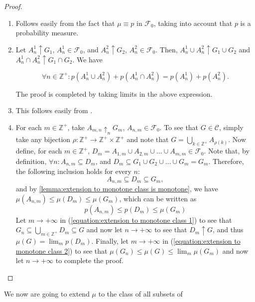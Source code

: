 \begin{proof}
	\begin{enumerate}
		\item Follows easily from the fact that \(\mu\equiv p\) in \(\mathcal{F}_0\),
taking into account that \(p\) is a probability measure.
		\item Let \(A_n^1\uparrow G_1\), \(A_n^1\in\mathcal{F}_0\), and
\(A_n^2\uparrow G_2\), \(A_n^2\in\mathcal{F}_0\). Then,
\(A_n^1\cup A_n^2\uparrow G_1\cup G_2\) and
\(A_n^1\cap A_n^2\uparrow G_1\cap G_2\). We have
		
		\[\forall n\in\mathbb{Z}^+:p(A_n^1\cup A_n^2)+p(A_n^1\cap A_n^2)=p(A_n^1)+p(A_n^2).\]
		
		The proof is completed by taking limits in the above expression.
		\item This follows easily from .
		\item For each \(m\in\mathbb{Z}^+\), take \(A_{m,n}\uparrow_{n} G_m\),
\(A_{n,m}\in\mathcal{F}_0\). To see that \(G\in\mathcal{C}\), simply take any bijection
\(\rho\colon\mathbb{Z}^+\to\mathbb{Z}^+\times\mathbb{Z}^+\) and note that
\(G=\bigcup_{k\in\mathbb{Z}^+}A_{\rho(k)}\). Now define, for each \(m\in\mathbb{Z}^+\),
\(D_m=A_{1,m}\cup A_{2,m}\cup\dots\cup A_{m,m}\in\mathcal{F}_0\). Note that, by
definition, \(\forall n:A_{n,m}\subseteq D_m\), and
\(D_m\subseteq G_1\cup G_2\cup\dots\cup G_m=G_m\). Therefore, the following
inclusion holds for every \(n\):
		\begin{equation}\label{equation:extension to monotone class
1} A_{n,m}\subseteq D_m\subseteq G_m,
		\end{equation} and by \ref{lemma:extension to monotone class is
monotone}, we have \(\mu(A_{n,m})\leq \mu(D_m)\leq\mu(G_m)\), which can be
written as
		\begin{equation}\label{equation:extension to monotone class
2} p(A_{n,m})\leq p(D_m)\leq\mu(G_m)
		\end{equation} Let \(m\to+\infty\) in (\ref{equation:extension to monotone class 1}) to see that \(G_n\subseteq \bigcup_{m\in\mathbb{Z}^+}D_m\subseteq G\) and now
let \(n\to+\infty\) to see that \(D_m\uparrow G\), and thus
\(\mu(G)=\lim_m p(D_m)\). Finally, let \(m\to+\infty\) in (\ref{equation:extension to monotone class 2}) to see that \(\mu(G_n)\leq \mu(G)\leq\lim_m\mu(G_m)\) and
now let \(n\to+\infty\) to complete the proof.
	\end{enumerate}
\end{proof}
We now are going to extend \(\mu\) to the class of all subsets of

